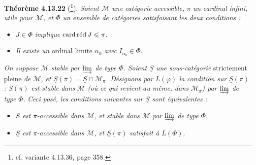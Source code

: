 \textbf{Théorème 4.13.22} (\footnote{cf. variante 4.13.36, page 358.}). \textit{Soient $\mathcal{M}$ une catégorie accessible, $\pi$ un cardinal infini, utile pour $\mathcal{M}$, et $\Phi$ un ensemble de catégories satisfaisant les deux conditions :}
\begin{itemize}[leftmargin=2.5em]
\item[\textit{1°)}] $J\in\Phi$ \textit{implique} $\cardred J\leqslant\pi$.
\item[\textit{2°)}] \textit{Il existe un} ordinal limite $\alpha_0$ \textit{avec} $I_{\alpha_0}\in\Phi$.
\end{itemize}
\textit{On suppose $\mathcal{M}$ stable par $\varinjlim$ de type $\Phi$. Soient $\underline{S}$ une sous-catégorie} strictement pleine \textit{de $\mathcal{M}$, et $\underline{S}(\pi)=\underline{S}\cap\mathcal{M}_\pi$. Désignons par $L(\varphi)$ la condition sur $\underline{S}(\pi)$ : $\underline{S}(\pi)$ est stable dans} %
\textit{$\mathcal{M}$ (où ce qui revient au même, dans $\mathcal{M}_\pi$) par $\varinjlim$ de type $\Phi$. Ceci posé, les conditions suivantes sur $\underline{S}$ sont équivalentes :} %
\begin{itemize}[leftmargin=2.5em]
\item[\cercle{a}] \textit{$\underline{S}$ est $\pi$-accessible dans $\mathcal{M}$, et stable dans $\mathcal{M}$ par $\varinjlim$ de type $\Phi$.}
\item[a$'$)] \textit{$\underline{S}$ est $\pi$-accessible dans $\mathcal{M}$, et $\underline{S}(\pi)$ satisfait à $L(\Phi)$.}
\end{itemize}
